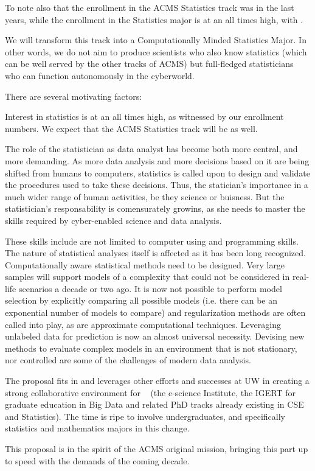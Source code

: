 To note also that the enrollment in the ACMS Statistics track was
 in the last years, while the enrollment in the Statistics
major is at an all times high, with .

We will transform this track into a Computationally Minded Statistics
Major. In other words, we do not aim to produce scientists who also
know statistics (which can be well served by the other tracks of ACMS)
but full-fledged statisticians who can function autonomously in the
cyberworld.

 There are several motivating factors:
\bit
\item Interest in statistics is at an all times high, as witnessed by our enrollment numbers. We expect that the ACMS Statistics track will be as well.
\item The role of the statistician as data analyst has become both
  more central, and more demanding. As more data analysis and more
  decisions based on it are being shifted from humans to computers,
  statistics is called upon to design and validate the procedures used
  to take these decisions. Thus, the statician's importance in a much
  wider range of human activities, be they science or buisness. But
  the statistician's responsability is comensurately growins, as she
  needs to master the skills required by cyber-enabled science and
  data analysis. 
\item These skills include are not limited to computer using and
  programming skills. The nature of statistical analyses itself is
  affected  as it has been long
  recognized. Computationally aware statistical methods need to be
  designed. Very large samples will support models of a complexity
  that could not be considered in real-life scenarios a decade or two
  ago. It is now not possible to perform model selection by explicitly
  comparing all possible models (i.e. there can be an exponential
  number of models to compare) and regularization methods are often
  called into play, as are approximate computational
  techniques. Leveraging unlabeled data for prediction is now an
  almost universal necessity. Devising new methods to evaluate complex
  models in an environment that is not stationary, nor controlled are
  some of the challenges of modern data analysis.
\item The proposal fits in and leverages other efforts and successes at UW in creating a strong collaborative environment for \cdse~ (the e-science Institute, the IGERT for graduate education in Big Data and related PhD tracks already existing in CSE and Statistics). The time is ripe to involve undergraduates, and specifically statistics and mathematics majors in this change.
\item This proposal is in the spirit of the ACMS original mission,
  bringing this part up to speed with the demands of the coming decade.
\eit

